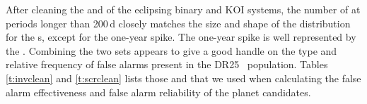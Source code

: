 After cleaning the  and  of the eclipsing binary and KOI systems, the number of  at periods longer than 200\,d closely matches the size and shape of the distribution for the \opstce s, except for the one-year spike. The one-year spike is well represented by the .  Combining the two sets appears to give a good handle on the type and relative frequency of false alarms present in the DR25 \opstce\ population. Tables\,\ref{t:invclean} and \ref{t:scrclean} lists those  and  that we used when calculating the false alarm effectiveness and false alarm reliability of the planet candidates.




